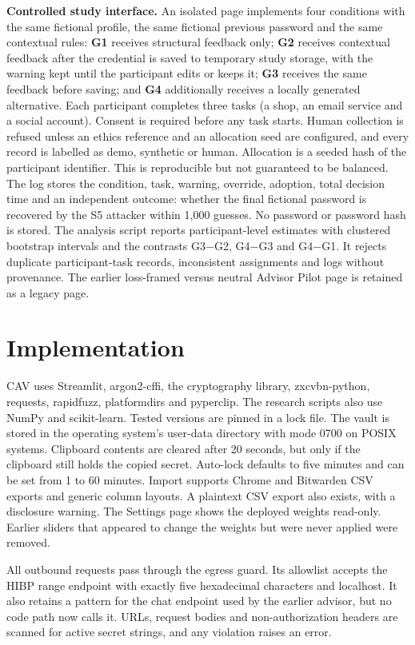 \documentclass[conference]{IEEEtran}
\begin{document}
\textbf{Controlled study interface.} An isolated page implements four conditions with the same fictional profile, the same fictional previous password and the same contextual rules: \textbf{G1} receives structural feedback only; \textbf{G2} receives contextual feedback after the credential is saved to temporary study storage, with the warning kept until the participant edits or keeps it; \textbf{G3} receives the same feedback before saving; and \textbf{G4} additionally receives a locally generated alternative. Each participant completes three tasks (a shop, an email service and a social account). Consent is required before any task starts. Human collection is refused unless an ethics reference and an allocation seed are configured, and every record is labelled as demo, synthetic or human. Allocation is a seeded hash of the participant identifier. This is reproducible but not guaranteed to be balanced. The log stores the condition, task, warning, override, adoption, total decision time and an independent outcome: whether the final fictional password is recovered by the S5 attacker within 1,000 guesses. No password or password hash is stored. The analysis script reports participant-level estimates with clustered bootstrap intervals and the contrasts G3$-$G2, G4$-$G3 and G4$-$G1. It rejects duplicate participant-task records, inconsistent assignments and logs without provenance. The earlier loss-framed versus neutral Advisor Pilot page is retained as a legacy page.

\section{Implementation}
\label{sec:impl}
CAV uses Streamlit, argon2-cffi, the cryptography library, zxcvbn-python, requests, rapidfuzz, platformdirs and pyperclip. The research scripts also use NumPy and scikit-learn. Tested versions are pinned in a lock file. The vault is stored in the operating system's user-data directory with mode 0700 on POSIX systems. Clipboard contents are cleared after 20 seconds, but only if the clipboard still holds the copied secret. Auto-lock defaults to five minutes and can be set from 1 to 60 minutes. Import supports Chrome and Bitwarden CSV exports and generic column layouts. A plaintext CSV export also exists, with a disclosure warning. The Settings page shows the deployed weights read-only. Earlier sliders that appeared to change the weights but were never applied were removed.

All outbound requests pass through the egress guard. Its allowlist accepts the HIBP range endpoint with exactly five hexadecimal characters and localhost. It also retains a pattern for the chat endpoint used by the earlier advisor, but no code path now calls it. URLs, request bodies and non-authorization headers are scanned for active secret strings, and any violation raises an error.
\end{document}
